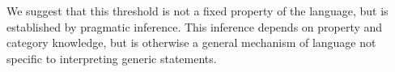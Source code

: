 \documentclass[10pt,letterpaper]{article}
\newcommand{\ndg}[1]{\textcolor{Green}{[ndg: #1]}}
\begin{document}
We suggest that this threshold is not a fixed property of the language, but is established by pragmatic inference.
This inference depends on property and category knowledge, but is otherwise a general mechanism of language not specific to interpreting generic statements.
%
%
%
%
%
\end{document}
